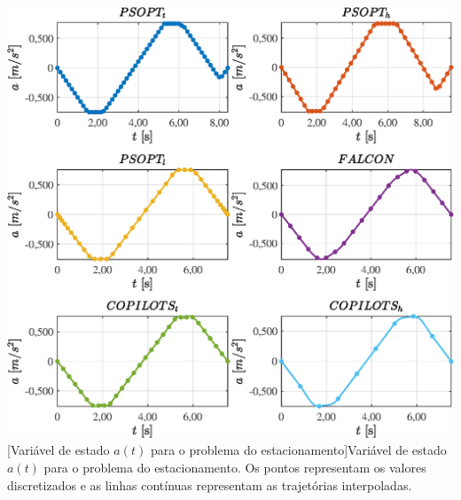 \noindent
\begin{minipage}{\textwidth}
	\vspace{\onelineskip}
	\centering
	\includegraphics[scale=0.7]{fig/resultados/estacionamento/traj/x/a}
	[Variável de estado $a(t)$ para o problema do estacionamento]{Variável de estado $a(t)$ para o problema do estacionamento. Os pontos representam os valores discretizados e as linhas contínuas representam as trajetórias interpoladas.}
	\label{fig:estacionamento:x:a}
	\vspace{\onelineskip}
\end{minipage}

